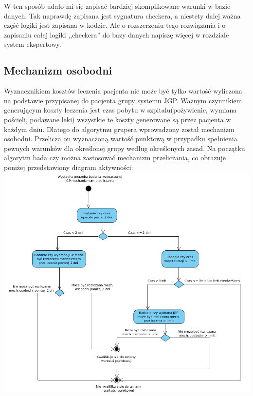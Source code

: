 W ten sposób udało mi się zapisać bardziej skomplikowane warunki w bazie danych. Tak naprawdę zapisana jest sygnatura checkera, a niestety dalej ważna część logiki jest zapisana w kodzie. Ale o rozszerzeniu tego rozwiązania  i o zapisaniu całej logiki ,,checkera'' do bazy danych napiszę więcej w rozdziale system ekspertowy.

\subsection{Mechanizm osobodni}
\label{sec:mechanizmOsobodni}
Wyznacznikiem kosztów leczenia pacjenta nie może być tylko wartość wyliczona na podstawie przypisanej do pacjenta grupy systemu JGP. Ważnym czynnikiem generującym koszty leczenia jest czas pobytu w szpitalu(pożywienie, wymiana pościeli, podawane leki) wszystkie te koszty generowane są przez pacjenta w każdym dniu. Dlatego do algorytmu grupera wprowadzony został mechanizm osobodni. Przelicza on wyznaczoną wartość punktową w przypadku spełnienia pewnych warunków dla określonej grupy według określonych zasad. Na początku algorytm bada czy można zastosować mechanizm przeliczania, co obrazuje poniżej przedstawiony diagram aktywności:
\includegraphics[scale=0.5]{images/activity-manday}

